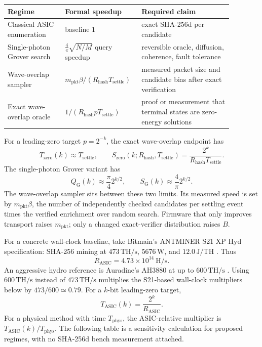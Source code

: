 \documentclass[11pt]{article}
\theoremstyle{definition}
\theoremstyle{remark}
\begin{document}
\begin{center}
\begin{minipage}{\linewidth}
\centering
\begin{tabular}{L{0.24\linewidth}L{0.26\linewidth}L{0.38\linewidth}}
\toprule
Regime & Formal speedup & Required claim\\
\midrule
Classical ASIC enumeration & baseline \(1\) & exact SHA-256d per candidate\\
Single-photon Grover search & \(\frac{4}{\pi}\sqrt{N/M}\) query speedup &
reversible oracle, diffusion, coherence, fault tolerance\\
Wave-overlap sampler & \(m_{\mathrm{pkt}}\beta/(R_{\mathrm{hash}}T_{\mathrm{settle}})\) &
measured packet size and candidate bias after exact verification\\
Exact wave-overlap oracle & \(1/(R_{\mathrm{hash}}pT_{\mathrm{settle}})\) &
proof or measurement that terminal states are zero-energy solutions\\
\bottomrule
\end{tabular}
\label{tab:speedups}
\end{minipage}
\end{center}

For a leading-zero target \(p=2^{-k}\), the exact wave-overlap endpoint has
\[
T_{\mathrm{zero}}(k)\approx T_{\mathrm{settle}},\qquad
S_{\mathrm{zero}}(k;R_{\mathrm{hash}},T_{\mathrm{settle}})
=\frac{2^k}{R_{\mathrm{hash}}T_{\mathrm{settle}}}.
\]
The single-photon Grover variant has
\[
Q_{\mathrm{G}}(k)\approx\frac{\pi}{4}2^{k/2},\qquad
S_{\mathrm{G}}(k)\approx\frac{4}{\pi}2^{k/2}.
\]
The wave-overlap sampler sits between these two limits. Its measured speed is
set by \(m_{\mathrm{pkt}}\beta\), the number of independently checked candidates per
settling event times the verified enrichment over random search. Firmware that
only improves transport raises \(m_{\mathrm{pkt}}\); only a changed
exact-verifier distribution raises \(B\).

For a concrete wall-clock baseline, take Bitmain's ANTMINER S21 XP Hyd
specification: SHA-256 mining at \(473\,\mathrm{TH/s}\), \(5676\,\mathrm{W}\),
and \(12.0\,\mathrm{J/TH}\) \cite{BitmainS21XPHyd2024}. Thus
\[
R_{\mathrm{ASIC}}=4.73\times10^{14}\ \mathrm{H/s}.
\]
An aggressive hydro reference is Auradine's AH3880 at up to
\(600\,\mathrm{TH/s}\) \cite{AuradineAH38802025}. Using \(600\,\mathrm{TH/s}\)
instead of \(473\,\mathrm{TH/s}\) multiplies the S21-based wall-clock
multipliers below by \(473/600\simeq0.79\). For a \(k\)-bit leading-zero target,
\[
T_{\mathrm{ASIC}}(k)=\frac{2^k}{R_{\mathrm{ASIC}}}.
\]
For a physical method with time \(T_{\mathrm{phys}}\), the ASIC-relative
multiplier is \(T_{\mathrm{ASIC}}(k)/T_{\mathrm{phys}}\). The following table is
a sensitivity calculation for proposed regimes, with no SHA-256d bench
measurement attached.
\end{document}
